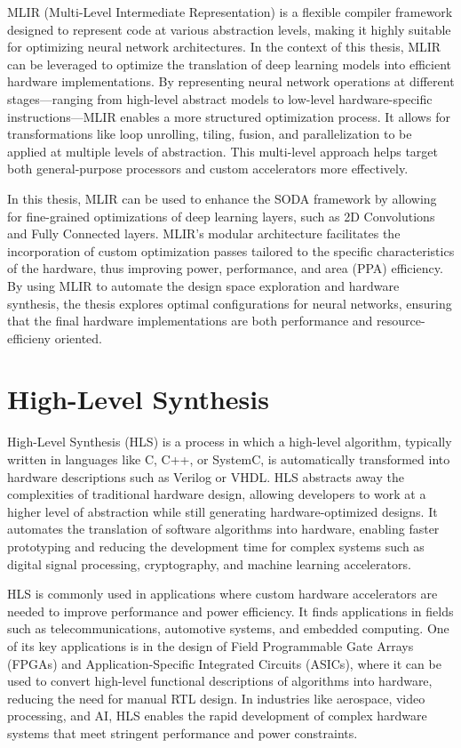 MLIR (Multi-Level Intermediate Representation) \cite{mlir} is a flexible compiler framework designed to represent code at various abstraction levels, making it highly suitable for optimizing neural network architectures. In the context of this thesis, MLIR can be leveraged to optimize the translation of deep learning models into efficient hardware implementations. By representing neural network operations at different stages—ranging from high-level abstract models to low-level hardware-specific instructions—MLIR enables a more structured optimization process. It allows for transformations like loop unrolling, tiling, fusion, and parallelization to be applied at multiple levels of abstraction. This multi-level approach helps target both general-purpose processors and custom accelerators more effectively.

In this thesis, MLIR can be used to enhance the SODA framework by allowing for fine-grained optimizations of deep learning layers, such as 2D Convolutions and Fully Connected layers. MLIR's modular architecture facilitates the incorporation of custom optimization passes tailored to the specific characteristics of the hardware, thus improving power, performance, and area (PPA) efficiency. By using MLIR to automate the design space exploration and hardware synthesis, the thesis explores optimal configurations for neural networks, ensuring that the final hardware implementations are both performance and resource-efficieny oriented.

\section{High-Level Synthesis}

High-Level Synthesis (HLS) is a process in which a high-level algorithm, typically written in languages like C, C++, or SystemC, is automatically transformed into hardware descriptions such as Verilog or VHDL. HLS abstracts away the complexities of traditional hardware design, allowing developers to work at a higher level of abstraction while still generating hardware-optimized designs. It automates the translation of software algorithms into hardware, enabling faster prototyping and reducing the development time for complex systems such as digital signal processing, cryptography, and machine learning accelerators.

HLS is commonly used in applications where custom hardware accelerators are needed to improve performance and power efficiency. It finds applications in fields such as telecommunications, automotive systems, and embedded computing. One of its key applications is in the design of Field Programmable Gate Arrays (FPGAs) and Application-Specific Integrated Circuits (ASICs), where it can be used to convert high-level functional descriptions of algorithms into hardware, reducing the need for manual RTL design. In industries like aerospace, video processing, and AI, HLS enables the rapid development of complex hardware systems that meet stringent performance and power constraints.

